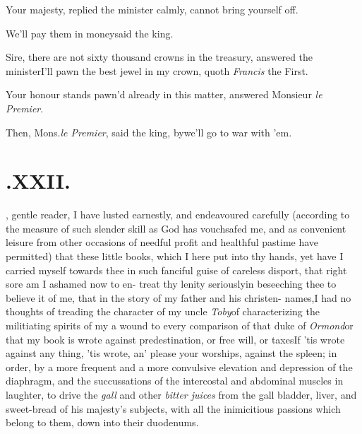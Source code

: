 \documentclass{article}
\begin{document}
Your majesty, replied the minister\break
calmly, cannot bring yourself off.

We’ll pay them in money\tsh said the king.

Sire, there are not sixty thousand\break
crowns in the treasury, answered the\break
minister\tsh I’ll pawn the best jewel
in my crown, quoth \textit{Francis} the First.

Your honour stands pawn’d already\break
in this matter, answered Monsieur \textit{le Premier}.

Then, Mons.\@ \textit{le Premier}, said the king,
by\tsh we’ll go to war with ’em.

\baselineskip

\section{.\enspace XXII.}

, gentle reader, I have\break
lusted earnestly, and endeavoured\break
carefully (according to the measure of such slender skill
as God has vouchsafed me, and as convenient leisure from
other occasions of needful profit and healthful pastime have
permitted) that these little books, which I here put into thy
hands,
\break
\tsk yet have I carried myself towards thee\break
in such fanciful guise of careless disport,\break
that right sore am I ashamed now to en-\break
{}\hbox{t}\sic reat thy lenity seriously\tsk in beseeching thee to
believe it of me, that in the\break
story of my father and his christen-\break 
names,\tsk I had no thoughts of treading 
the character of my uncle \textit{Toby}\tsk of cha\-racterizing
the militiating spirits of my  a wound to every comparison of that 
duke of \textit{Ormond}\tsk or that my book is wrote against
predestination, or free will, or taxes\tsk If ’tis wrote
against any thing,\break
\tsh ’tis wrote, an’ please your worships,
against the spleen; in order, by a more
frequent and a more convulsive elevation and depression of
the diaphragm, and the succussations of the intercostal and
abdominal muscles in laughter, to drive the \textit{gall}
and other \textit{bitter juices} from the gall bladder,
liver, and sweet-bread of his majesty’s subjects, with all
the inimicitious passions which belong to them,\break
down into their duodenums.
\end{document}

